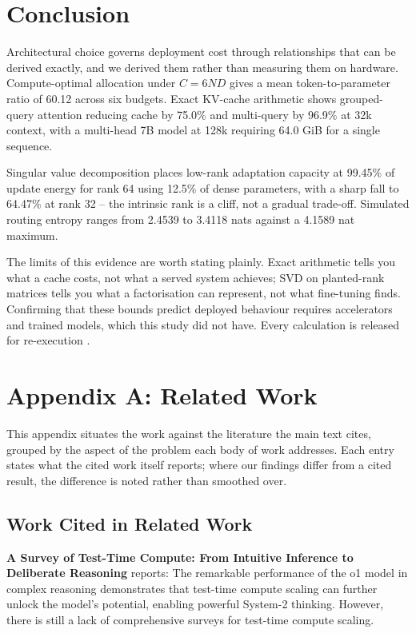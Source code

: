 \documentclass[10pt,journal,compsoc,twocolumn]{IEEEtran}
\begin{document}
\section{Conclusion}


Architectural choice governs deployment cost through relationships that can be derived exactly, and we derived them rather than measuring them on hardware. Compute-optimal allocation under $C = 6ND$ gives a mean token-to-parameter ratio of 60.12 across six budgets. Exact KV-cache arithmetic shows grouped-query attention reducing cache by 75.0\% and multi-query by 96.9\% at 32k context, with a multi-head 7B model at 128k requiring 64.0 GiB for a single sequence.

Singular value decomposition places low-rank adaptation capacity at 99.45\% of update energy for rank 64 using 12.5\% of dense parameters, with a sharp fall to 64.47\% at rank 32 -- the intrinsic rank is a cliff, not a gradual trade-off. Simulated routing entropy ranges from 2.4539 to 3.4118 nats against a 4.1589 nat maximum.

The limits of this evidence are worth stating plainly. Exact arithmetic tells you what a cache costs, not what a served system achieves; SVD on planted-rank matrices tells you what a factorisation can represent, not what fine-tuning finds. Confirming that these bounds predict deployed behaviour requires accelerators and trained models, which this study did not have. Every calculation is released for re-execution \cite{arxiv_2406_00584,crossref_10_1201_9788743808145_14}.





\section{Appendix A: Related Work}


This appendix situates the work against the literature the main text cites, grouped by the aspect of the problem each body of work addresses. Each entry states what the cited work itself reports; where our findings differ from a cited result, the difference is noted rather than smoothed over.


\subsection{Work Cited in Related Work}


\textbf{A Survey of Test-Time Compute: From Intuitive Inference to Deliberate Reasoning} \cite{arxiv_2501_02497} reports: The remarkable performance of the o1 model in complex reasoning demonstrates that test-time compute scaling can further unlock the model's potential, enabling powerful System-2 thinking. However, there is still a lack of comprehensive surveys for test-time compute scaling.
\end{document}
